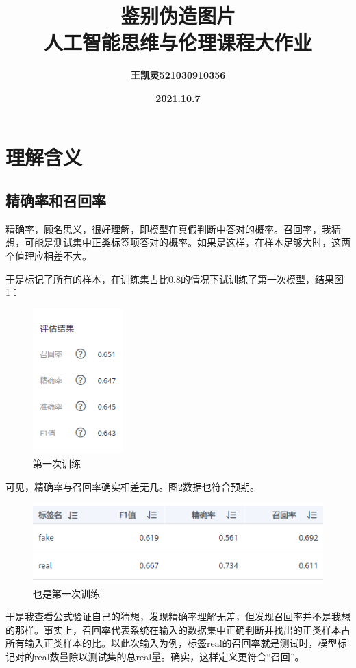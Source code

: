 \documentclass[boldfont,linespread=1.35]{ctexart}
\title{\textbf{
		\zihao{1}鉴别伪造图片\\
		\zihao{2}人工智能思维与伦理课程大作业
	}}
\author{\textbf{王凯灵521030910356}}
\date{\textbf{2021.10.7}}
\begin{document}
	\maketitle
\section{理解含义}
\subsection{精确率和召回率}
精确率，顾名思义，很好理解，即模型在真假判断中答对的概率。召回率，我猜想，可能是测试集中正类标签项答对的概率。如果是这样，在样本足够大时，这两个值理应相差不大。

于是标记了所有的样本，在训练集占比0.8的情况下试训练了第一次模型，结果图1：
\begin{figure}[h]
	\centering
	\includegraphics[width=3.5cm]{screenshot001}
	\color{gray}\caption{ 第一次训练}
\end{figure}

可见，精确率与召回率确实相差无几。图2数据也符合预期。

\begin{figure}[h]
	\centering
	\includegraphics[width=10 cm]{screenshot002}
	\color{gray}\caption{也是第一次训练}
\end{figure}

于是我查看公式验证自己的猜想，发现精确率理解无差，但发现召回率并不是我想的那样。事实上，召回率代表系统在输入的数据集中正确判断并找出的正类样本占所有输入正类样本的比。以此次输入为例，标签real的召回率就是测试时，模型标记对的real数量除以测试集的总real量。确实，这样定义更符合“召回”。
\end{document}
